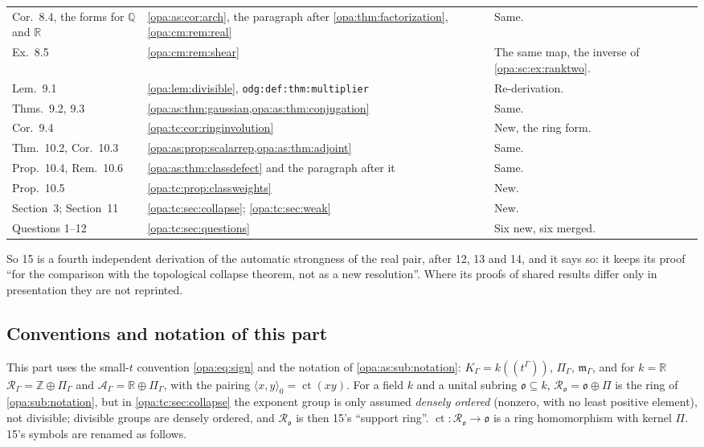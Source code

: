 \documentclass[11pt,oneside]{article}
\numberwithin{equation}{section}
\theoremstyle{definition}
\theoremstyle{remark}
\newcommand{\R}{\mathbb R}
\newcommand{\Q}{\mathbb Q}
\newcommand{\Z}{\mathbb Z}
\newcommand{\oo}{\mathfrak o}
\newcommand{\Ro}{\mathcal R_{\oo}}
\newcommand{\mm}{\mathfrak m}
\newcommand{\ct}{\operatorname{ct}}
\newcommand{\Hahn}[2]{#1((t^{#2}))}
\newcommand{\lbl}[1]{\nolinkurl{#1}}
\newcommand{\pairing}[2]{\langle #1,#2\rangle_0}
\begin{document}
\begin{center}
\begin{longtable}{>{\raggedright\arraybackslash}p{}>{\raggedright\arraybackslash}p{}>{\raggedright\arraybackslash}p{}}
Cor.~8.4, the forms for $\Q$ and $\R$ & \cref{opa:as:cor:arch}, the paragraph after
\cref{opa:thm:factorization}, \cref{opa:cm:rem:real} & Same.\\
Ex.~8.5 & \cref{opa:cm:rem:shear} & The same map, the inverse of \cref{opa:sc:ex:ranktwo}.\\
Lem.~9.1 & \cref{opa:lem:divisible}, \lbl{odg:def:thm:multiplier} & Re-derivation.\\
Thms.~9.2, 9.3 & \cref{opa:as:thm:gaussian,opa:as:thm:conjugation} & Same.\\
Cor.~9.4 & \cref{opa:tc:cor:ringinvolution} & New, the ring form.\\
Thm.~10.2, Cor.~10.3 & \cref{opa:as:prop:scalarrep,opa:as:thm:adjoint} & Same.\\
Prop.~10.4, Rem.~10.6 & \cref{opa:as:thm:classdefect} and the paragraph after it & Same.\\
Prop.~10.5 & \cref{opa:tc:prop:classweights} & New.\\
Section~3; Section~11 & \cref{opa:tc:sec:collapse}; \cref{opa:tc:sec:weak} & New.\\
Questions 1--12 & \cref{opa:tc:sec:questions} & Six new, six merged.\\
\bottomrule
\end{longtable}
\end{center}

So 15 is a fourth independent derivation of the automatic strongness of the real pair, after 12, 13
and 14, and it says so: it keeps its proof ``for the comparison with the topological collapse
theorem, not as a new resolution''. Where its proofs of shared results differ only in presentation
they are not reprinted.

\subsection{Conventions and notation of this part}\label{opa:tc:sub:notation}

This part uses the small-$t$ convention \eqref{opa:eq:sign} and the notation of
\cref{opa:as:sub:notation}: $K_\Gamma=\Hahn k\Gamma$, $\Pi_\Gamma$, $\mm_\Gamma$, and for $k=\R$
$\mathcal R_\Gamma=\Z\oplus\Pi_\Gamma$ and $\mathcal A_\Gamma=\R\oplus\Pi_\Gamma$, with the pairing
$\pairing xy=\ct(xy)$. For a field $k$ and a unital subring $\oo\subseteq k$, $\Ro=\oo\oplus\Pi$ is the
ring of \cref{opa:sub:notation}, but in \cref{opa:tc:sec:collapse} the exponent group is only assumed
\emph{densely ordered} (nonzero, with no least positive element), not divisible; divisible groups are
densely ordered, and $\Ro$ is then 15's ``support ring''. $\ct:\Ro\to\oo$ is a ring homomorphism with
kernel $\Pi$. 15's symbols are renamed as follows.
\end{document}
